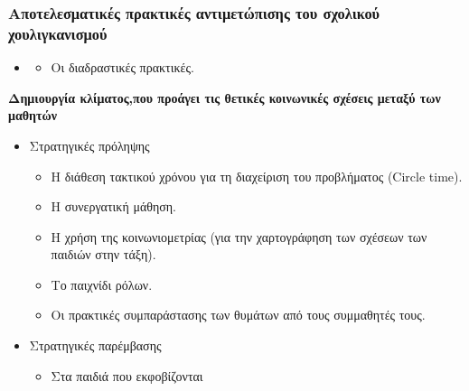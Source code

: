 \documentclass[hyperref={pdfpagelabels=false}, t]{beamer}
\let\olditem=\item%
\renewcommand{\item}{\olditem \justifying}%
\begin{document}
%
%

\begin{frame}[t]
\frametitle{Αποτελεσματικές πρακτικές αντιμετώπισης του σχολικού
χουλιγκανισμού}
\vspace{-18.5pt}
\begin{adjustwidth}{-0.7cm}{}
\justifying
\begin{itemize}
  \item
    \begin{itemize}
    \item Οι διαδραστικές πρακτικές.
    \end{itemize}
\end{itemize}    
\begin{list}{\quad}{}
\item \textbf{Δημιουργία κλίματος,που προάγει τις θετικές κοινωνικές σχέσεις
μεταξύ των μαθητών
}
\end{list}
\begin{itemize}
  \item Στρατηγικές πρόληψης \setlength{\itemsep}{15pt}  
  \begin{itemize}
  \item Η διάθεση τακτικού χρόνου για τη διαχείριση του προβλήματος (Circle
  time).  
  \item Η συνεργατική μάθηση. 
  \item Η χρήση της κοινωνιομετρίας (για την χαρτογράφηση των σχέσεων των παιδιών στην τάξη). 
  \item Το παιχνίδι ρόλων.  
  \item Οι  πρακτικές συμπαράστασης των θυμάτων από τους συμμαθητές τους. 
  \end{itemize}
  \item Στρατηγικές παρέμβασης \setlength{\itemsep}{15pt} 
    \begin{itemize}
  \item Στα παιδιά που εκφοβίζονται
    \end{itemize}
\end{itemize}



\end{adjustwidth}
\end{frame}



%
%
\end{document}
